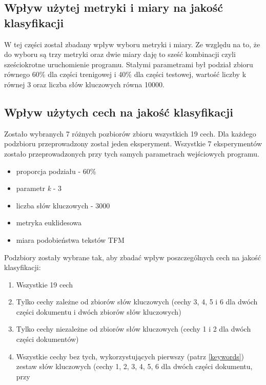 \documentclass{classrep}
\begin{document}
{        \subsection{Wpływ użytej metryki i miary na jakość klasyfikacji} {
            W tej części został zbadany wpływ wyboru metryki i miary. Ze względu na to, że
            do wyboru są trzy metryki oraz dwie miary daję to sześć kombinacji czyli sześciokrotne
            uruchomienie programu. Stałymi parametrami był podział zbioru równego 60\% dla
            części trenigowej i 40\% dla części testowej, wartość liczby k równej 3 oraz liczba
            słów kluczowych równa 10000.
        }

        \subsection{Wpływ użytych cech na jakość klasyfikacji} {
            Zostało wybranych 7 różnych pozbiorów zbioru wszystkich 19 cech. Dla każdego podzbioru
            przeprowadzony został jeden eksperyment. Wszystkie 7 eksperymentów zostało
            przeprowadzonych przy tych samych parametrach wejściowych programu.
            \begin{itemize}
                \item proporcja podziału - 60\%
                \item parametr \emph{k} - 3
                \item liczba słów kluczowych - 3000
                \item metryka euklidesowa
                \item miara podobieństwa tekstów TFM
            \end{itemize}
            Podzbiory zostały wybrane tak, aby zbadać wpływ poszczególnych cech na jakość
            klasyfikacji:
            \begin{enumerate}
                \item Wszystkie 19 cech
                \item Tylko cechy zależne od zbiorów słów kluczowych (cechy 3, 4, 5 i 6 dla dwóch
                    części dokumentu i dwóch zbiorów słów kluczowych)
                \item Tylko cechy niezależne od zbiorów słów kluczowych (cechy 1 i 2 dla dwóch
                    części dokumentów)
                \item Wszystkie cechy bez tych, wykorzystujących pierwszy (patrz \ref{keywords})
                    zestaw słów kluczowych (cechy 1, 2, 3, 4, 5, 6 dla dwóch części dokumentu, przy

\end{enumerate}}}
\end{document}
